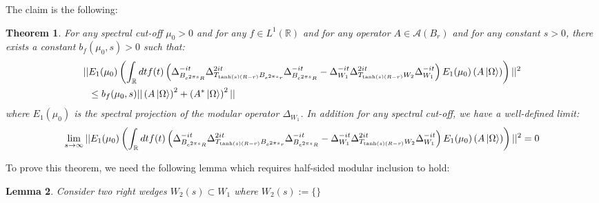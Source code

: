 \documentclass[a4paper,11pt]{article}
\newtheorem{theorem}{Theorem}
\newtheorem{lemma}[theorem]{Lemma}
\theoremstyle{definition}
\newcommand{\lb}{\left(}
\newcommand{\rb}{\right)}
\begin{document}
The claim is the following:
\begin{theorem}
    For any spectral cut-off $\mu_0 > 0$ and for any $f\in L^1(\mathbb{R})$ and for any operator $A\in\mathcal{A}(B_r)$ and for any constant $s > 0$, there exists a constant $b_f(\mu_0, s) >0$ such that:
    \begin{align}
        \begin{split}
            ||&E_1(\mu_0)\lb \int_\mathbb{R} dt f(t)\lb \Delta_{B_{e^{2\pi s}R}}^{-it}\Delta_{T_{\tanh(s)(R-r)}B_{e^{2\pi s}r}}^{2it}\Delta_{B_{e^{2\pi s}R}}^{-it} - \Delta_{W_1}^{-it}\Delta_{T_{\tanh(s)(R - r)}W_2}^{2it}\Delta_{W_1}^{-it} \rb E_1(\mu_0)\lb A\ket{\Omega}\rb \rb||^2 
            \\&
            \leq b_f(\mu_0, s)||\lb A\ket{\Omega}\rb^2 + \lb A^*\ket{\Omega} \rb^2||
        \end{split}
    \end{align}
    where $E_1(\mu_0)$ is the spectral projection of the modular operator $\Delta_{W_1}$. In addition for any spectral cut-off, we have a well-defined limit:
    \begin{align}
        \begin{split}
            \lim_{s\rightarrow\infty}||E_1(\mu_0)\lb \int_\mathbb{R} dt f(t)\lb \Delta_{B_{e^{2\pi s}R}}^{-it}\Delta_{T_{\tanh(s)(R-r)}B_{e^{2\pi s}r}}^{2it}\Delta_{B_{e^{2\pi s}R}}^{-it} - \Delta_{W_1}^{-it}\Delta_{T_{\tanh(s)(R - r)}W_2}^{2it}\Delta_{W_1}^{-it} \rb E_1(\mu_0)\lb A\ket{\Omega}\rb \rb||^2  = 0
        \end{split}
    \end{align}
\end{theorem}
To prove this theorem, we need the following lemma which requires half-sided modular inclusion to hold:
\begin{lemma}
    Consider two right wedges $W_2(s)\subset W_1$ where $W_2(s) := \{\}$
\end{lemma}
\end{document}
